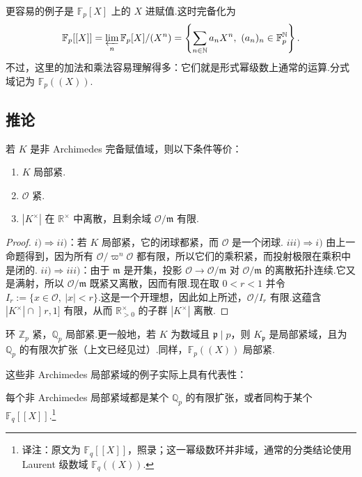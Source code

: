 \begin{example*}
更容易的例子是 $\mathbb F_p[X]$ 上的 $X$ 进赋值.这时完备化为
\begin{align*}
\mathbb F_p[[X]]=\varprojlim_n\mathbb F_p[X]/(X^n)
=\left\{\sum_{n\in\mathbb N}a_nX^n,\ (a_n)_n\in\mathbb F_p^{\mathbb N}\right\}.
\end{align*}
不过，这里的加法和乘法容易理解得多：它们就是形式幂级数上通常的运算.分式域记为 $\mathbb F_p((X))$.
\end{example*}
\subsection{推论}\label{sec:nt-4-2-3}
\begin{corollary*}
若 $K$ 是非 Archimedes 完备赋值域，则以下条件等价：
\begin{enumerate}[label=\roman*)]
\item $K$ 局部紧.
\item $\mathcal O$ 紧.
\item $|K^\times|$ 在 $\mathbb R^\times$ 中离散，且剩余域 $\mathcal O/\mathfrak m$ 有限.
\end{enumerate}
\end{corollary*}
\begin{proof}
$i)\Rightarrow ii)$：若 $K$ 局部紧，它的闭球都紧，而 $\mathcal O$ 是一个闭球.
$iii)\Rightarrow i)$ 由上一命题得到，因为所有 $\mathcal O/\varpi^n\mathcal O$ 都有限，所以它们的乘积紧，而投射极限在乘积中是闭的.
$ii)\Rightarrow iii)$：由于 $\mathfrak m$ 是开集，投影 $\mathcal O\longrightarrow\mathcal O/\mathfrak m$ 对 $\mathcal O/\mathfrak m$ 的离散拓扑连续.它又是满射，所以 $\mathcal O/\mathfrak m$ 既紧又离散，因而有限.现在取 $0<r<1$ 并令 $I_r:=\{x\in\mathcal O,\ |x|<r\}$.这是一个开理想，因此如上所述，$\mathcal O/I_r$ 有限.这蕴含 $|K^\times|\cap\mathopen]r,1\mathclose]$ 有限，从而 $\mathbb R_{>0}^\times$ 的子群 $|K^\times|$ 离散.
\end{proof}
\begin{example*}
环 $\mathbb Z_p$ 紧，$\mathbb Q_p$ 局部紧.更一般地，若 $K$ 为数域且 $\mathfrak p\mid p$，则 $K_{\mathfrak p}$ 是局部紧域，且为 $\mathbb Q_p$ 的有限次扩张（上文已经见过）.同样，$\mathbb F_p((X))$ 局部紧.
\end{example*}
这些非 Archimedes 局部紧域的例子实际上具有代表性：
\begin{proposition*}
每个非 Archimedes 局部紧域都是某个 $\mathbb Q_p$ 的有限扩张，或者同构于某个 $\mathbb F_q[[X]]$.\footnote{译注：原文为 $\mathbb F_q[[X]]$，照录；这一幂级数环并非域，通常的分类结论使用 Laurent 级数域 $\mathbb F_q((X))$.}
\end{proposition*}

